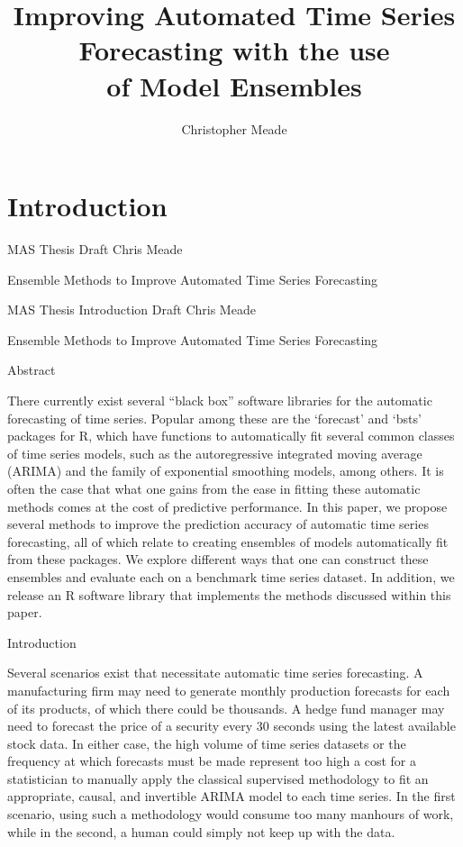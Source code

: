 \documentclass [M] {uclathes}
\title          {Improving Automated Time Series\\
                Forecasting with the use \\
                of Model Ensembles}
\author         {Christopher Meade}
\begin{document}
\makeintropages

%
%

\chapter{Introduction}

MAS Thesis Draft
Chris Meade

Ensemble Methods to Improve Automated Time Series Forecasting


MAS Thesis Introduction Draft
Chris Meade

Ensemble Methods to Improve Automated Time Series Forecasting


Abstract

There currently exist several “black box” software libraries for the automatic forecasting of time series. Popular among these are the ‘forecast’  and ‘bsts’ packages for R, which have functions to automatically fit several common classes of time series models, such as the autoregressive integrated moving average (ARIMA) and the family of exponential smoothing models, among others. It is often the case that what one gains from the ease in fitting these automatic methods comes at the cost of predictive performance. In this paper, we propose several methods to improve the prediction accuracy of automatic time series forecasting, all of which relate to creating ensembles of models automatically fit from these packages. We explore different ways that one can construct these ensembles and evaluate each on a benchmark time series dataset. In addition, we release an R software library that implements the methods discussed within this paper.

Introduction

Several scenarios exist that necessitate automatic time series forecasting. A manufacturing firm may need to generate monthly production forecasts for each of its products, of which there could be thousands. A hedge fund manager may need to forecast the price of a security every 30 seconds using the latest available stock data. In either case, the high volume of time series datasets or the frequency at which forecasts must be made represent too high a cost for a statistician to manually apply the classical supervised methodology to fit an appropriate, causal, and invertible ARIMA model to each time series. In the first scenario, using such a methodology would consume too many manhours of work, while in the second, a human could simply not keep up with the data.
\end{document}
